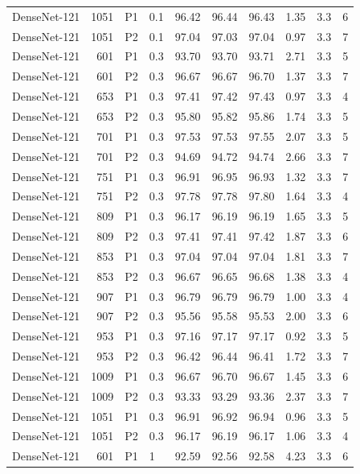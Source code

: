 {\begin{longtable}{lrllrrrrrr}
DenseNet-121 & 1051 & P1 & 0.1 & 96.42 & 96.44 & 96.43 & 1.35 & 3.3 & 6 \\
DenseNet-121 & 1051 & P2 & 0.1 & 97.04 & 97.03 & 97.04 & 0.97 & 3.3 & 7 \\
DenseNet-121 & 601 & P1 & 0.3 & 93.70 & 93.70 & 93.71 & 2.71 & 3.3 & 5 \\
DenseNet-121 & 601 & P2 & 0.3 & 96.67 & 96.67 & 96.70 & 1.37 & 3.3 & 7 \\
DenseNet-121 & 653 & P1 & 0.3 & 97.41 & 97.42 & 97.43 & 0.97 & 3.3 & 4 \\
DenseNet-121 & 653 & P2 & 0.3 & 95.80 & 95.82 & 95.86 & 1.74 & 3.3 & 5 \\
DenseNet-121 & 701 & P1 & 0.3 & 97.53 & 97.53 & 97.55 & 2.07 & 3.3 & 5 \\
DenseNet-121 & 701 & P2 & 0.3 & 94.69 & 94.72 & 94.74 & 2.66 & 3.3 & 7 \\
DenseNet-121 & 751 & P1 & 0.3 & 96.91 & 96.95 & 96.93 & 1.32 & 3.3 & 7 \\
DenseNet-121 & 751 & P2 & 0.3 & 97.78 & 97.78 & 97.80 & 1.64 & 3.3 & 4 \\
DenseNet-121 & 809 & P1 & 0.3 & 96.17 & 96.19 & 96.19 & 1.65 & 3.3 & 5 \\
DenseNet-121 & 809 & P2 & 0.3 & 97.41 & 97.41 & 97.42 & 1.87 & 3.3 & 6 \\
DenseNet-121 & 853 & P1 & 0.3 & 97.04 & 97.04 & 97.04 & 1.81 & 3.3 & 7 \\
DenseNet-121 & 853 & P2 & 0.3 & 96.67 & 96.65 & 96.68 & 1.38 & 3.3 & 4 \\
DenseNet-121 & 907 & P1 & 0.3 & 96.79 & 96.79 & 96.79 & 1.00 & 3.3 & 4 \\
DenseNet-121 & 907 & P2 & 0.3 & 95.56 & 95.58 & 95.53 & 2.00 & 3.3 & 6 \\
DenseNet-121 & 953 & P1 & 0.3 & 97.16 & 97.17 & 97.17 & 0.92 & 3.3 & 5 \\
DenseNet-121 & 953 & P2 & 0.3 & 96.42 & 96.44 & 96.41 & 1.72 & 3.3 & 7 \\
DenseNet-121 & 1009 & P1 & 0.3 & 96.67 & 96.70 & 96.67 & 1.45 & 3.3 & 6 \\
DenseNet-121 & 1009 & P2 & 0.3 & 93.33 & 93.29 & 93.36 & 2.37 & 3.3 & 7 \\
DenseNet-121 & 1051 & P1 & 0.3 & 96.91 & 96.92 & 96.94 & 0.96 & 3.3 & 5 \\
DenseNet-121 & 1051 & P2 & 0.3 & 96.17 & 96.19 & 96.17 & 1.06 & 3.3 & 4 \\
DenseNet-121 & 601 & P1 & 1 & 92.59 & 92.56 & 92.58 & 4.23 & 3.3 & 6 \\

\end{longtable}}
